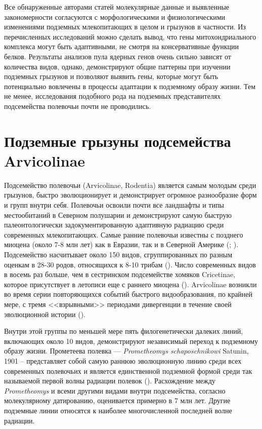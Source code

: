 Все обнаруженные авторами статей молекулярные данные и выявленные закономерности согласуются с морфологическими и физиологическими изменениями подземных млекопитающих в целом и грызунов в частности. Из перечисленных исследований можно сделать вывод, что гены митохондриального комплекса могут быть адаптивными, не смотря на консервативные функции белков. Результаты анализов пула ядерных генов очень сильно зависят от количества видов, однако, демонстрируют общие паттерны при изучении подземных грызунов и позволяют выявить гены, которые могут быть потенциально вовлечены в процессы адаптации к подземному образу жизни. Тем не менее, исследования подобного рода на подземных представителях подсемейства полевочьи почти не проводились. 



\section{Подземные грызуны подсемейства Arvicolinae}

Подсемейство полевочьи (Arvicolinae, Rodentia) является самым молодым среди грызунов, быстро эволюционирует и демонстрирует огромное разнообразие форм и групп внутри себя. Полевочьи освоили почти все ландшафты и типы местообитаний в Северном полушарии и демонстрируют самую быструю палеонтологически задокументированную адаптивную радиацию среди современных млекопитающих. Самые ранние полевочьи известны с позднего миоцена (около 7-8 млн лет) как в Евразии, так и в Северной Америке (\cite{RobertA.Martin2003}; \cite{Fejfar2011}). Подсемейство насчитывает около 150 видов, сгруппированных по разным оценкам в 28-30 родов, относящихся к 8-10 трибам (\cite{Musser2005}). Число современных видов в восемь раз больше, чем в сестринском подсемействе хомяков Cricetinae, которое присутствует в летописи еще с раннего миоцена (\cite{GomesRodrigues2012}). Arvicolinae возникли во время серии повторяющихся событий быстрого видообразования, по крайней мере, с тремя <<взрывными>> периодами дивергенции в течение своей эволюционной истории (\cite{Abramson2009}).

Внутри этой группы по меньшей мере пять филогенетически далеких линий, включающих около 10 видов, демонстрируют независимый переход к подземному образу жизни. Прометеева полевка --- \textit{Prometheomys schaposchnikowi} Satunin, 1901 -- представляет собой самую раннюю эволюционную линию среди всех современных полевочьих и является единственной подземной формой среди так называемой первой волны радиации полевок (\cite{Abramson2009}). 
Расхождение между \textit{Prometheomys} и всеми другими видами внутри подсемейства, согласно молекулярному датированию, оценивается примерно в 7 млн лет. Другие подземные линии  относятся к наиболее многочисленной последней волне радиации. 

